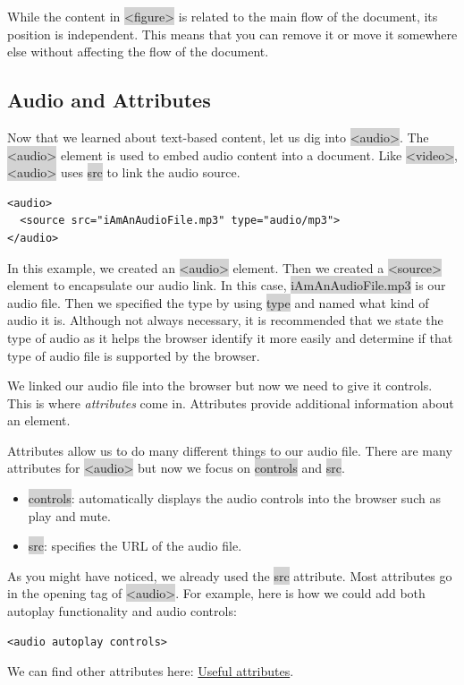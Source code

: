 \documentclass[11pt]{article}
\begin{document}
While the content in \colorbox{lightgray}{<figure>} is related to the main flow of the document, its position is independent. This means that you can remove it or move it somewhere else without affecting the flow of the document.

\subsection{Audio and Attributes}
Now that we learned about text-based content, let us dig into \colorbox{lightgray}{<audio>}. The \colorbox{lightgray}{<audio>} element is used to embed audio content into a document. Like \colorbox{lightgray}{<video>}, \colorbox{lightgray}{<audio>} uses \colorbox{lightgray}{src} to link the audio source.
\begin{lstlisting}
<audio>
  <source src="iAmAnAudioFile.mp3" type="audio/mp3">
</audio>
\end{lstlisting}
In this example, we created an \colorbox{lightgray}{<audio>} element. Then we created a \colorbox{lightgray}{<source>} element to encapsulate our audio link. In this case, \colorbox{lightgray}{iAmAnAudioFile.mp3} is our audio file. Then we specified the type by using \colorbox{lightgray}{type} and named what kind of audio it is. Although not always necessary, it is recommended that we state the type of audio as it helps the browser identify it more easily and determine if that type of audio file is supported by the browser.

We linked our audio file into the browser but now we need to give it controls. This is where \textit{attributes} come in. Attributes provide additional information about an element.

Attributes allow us to do many different things to our audio file. There are many attributes for \colorbox{lightgray}{<audio>} but now we focus on \colorbox{lightgray}{controls} and \colorbox{lightgray}{src}.
\begin{itemize}[leftmargin = *]
\item \colorbox{lightgray}{controls}: automatically displays the audio controls into the browser such as play and mute.
\item \colorbox{lightgray}{src}: specifies the URL of the audio file.
\end{itemize}
As you might have noticed, we already used the \colorbox{lightgray}{src} attribute. Most attributes go in the opening tag of \colorbox{lightgray}{<audio>}. For example, here is how we could add both autoplay functionality and audio controls:
\begin{lstlisting}
<audio autoplay controls>
\end{lstlisting}
We can find other attributes here: \href{https://developer.mozilla.org/en-US/docs/Web/HTML/Element/audio#Attributes}{Useful attributes}.
\end{document}

